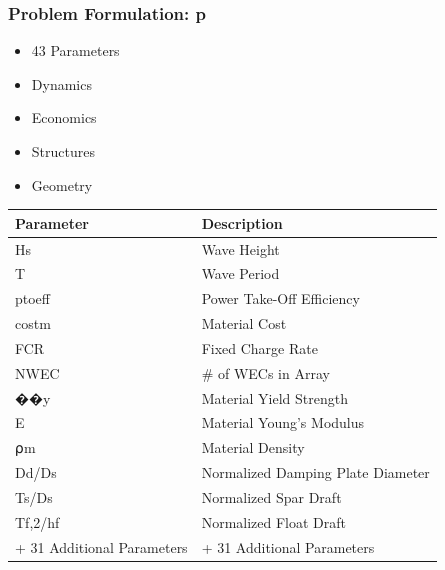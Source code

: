 \begin{frame}
	\frametitle{Problem Formulation: p}
	\begin{itemize}
		\item 43 Parameters
		\item Dynamics
		\item Economics
		\item Structures
		\item Geometry
	\end{itemize}
	\begin{tabular}{|l|l|} \hline
		Parameter                  & Description                       \\ \hline
		Hs                         & Wave Height                       \\ \hline
		T                          & Wave Period                       \\ \hline
		ptoeff                     & Power Take-Off Efficiency         \\ \hline
		costm                      & Material Cost                     \\ \hline
		FCR                        & Fixed Charge Rate                 \\ \hline
		NWEC                       & # of WECs in Array                \\ \hline
		��y                    & Material Yield Strength           \\ \hline
		E                          & Material Young’s Modulus        \\ \hline
		⍴m                       & Material Density                  \\ \hline
		Dd/Ds                      & Normalized Damping Plate Diameter \\ \hline
		Ts/Ds                      & Normalized Spar Draft             \\ \hline
		Tf,2/hf                    & Normalized Float Draft            \\ \hline
		+ 31 Additional Parameters & + 31 Additional Parameters        \\ \hline
	\end{tabular}
	
	
\end{frame}


